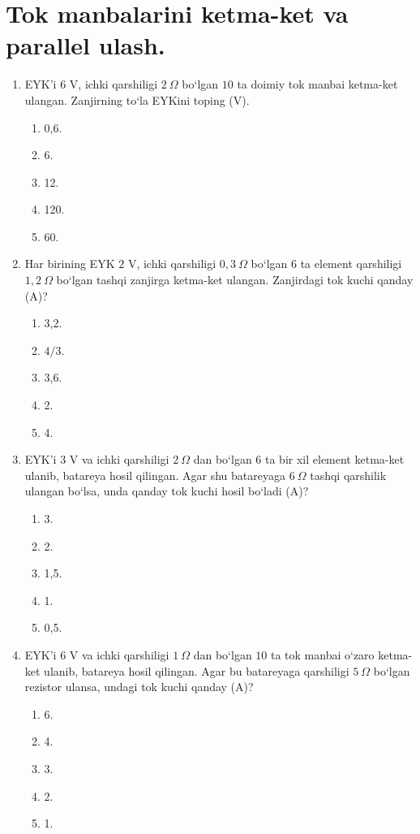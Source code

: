 \section{ Tok manbalarini ketma-ket va parallel ulash.}



\begin{enumerate}

\item EYK’i $6$ V, ichki qarshiligi $2~\Omega$ bo‘lgan $10$ ta doimiy tok manbai ketma-ket ulangan. Zanjirning to‘la EYKini toping (V).
\begin{enumerate}[label=\Alph*)]
\item 0,6.
\item 6.
\item 12.
\item 120.
\item 60.
\end{enumerate}

\item Har birining EYK $2$ V, ichki qarshiligi $0,3~\Omega$ bo‘lgan $6$ ta element qarshiligi $1,2~\Omega$ bo‘lgan tashqi zanjirga ketma-ket ulangan. Zanjirdagi tok kuchi qanday (A)?
\begin{enumerate}[label=\Alph*)]
\item 3,2.
\item $4/3$.
\item 3,6.
\item 2.
\item 4.
\end{enumerate}

\item EYK’i $3$ V va ichki qarshiligi $2~\Omega$ dan bo‘lgan $6$ ta bir xil element ketma-ket ulanib, batareya hosil qilingan. Agar shu batareyaga $6~\Omega$ tashqi qarshilik ulangan bo‘lsa, unda qanday tok kuchi hosil bo‘ladi (A)?
\begin{enumerate}[label=\Alph*)]
\item 3.
\item 2.
\item 1,5.
\item 1.
\item 0,5.
\end{enumerate}

\item EYK’i $6$ V va ichki qarshiligi $1~\Omega$ dan bo‘lgan $10$ ta tok manbai o‘zaro ketma-ket ulanib, batareya hosil qilingan. Agar bu batareyaga qarshiligi $5~\Omega$ bo‘lgan rezistor ulansa, undagi tok kuchi qanday (A)?
\begin{enumerate}[label=\Alph*)]
\item 6.
\item 4.
\item 3.
\item 2.
\item 1.
\end{enumerate}


\end{enumerate}
